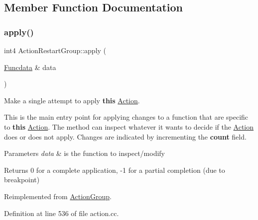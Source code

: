\subsection{Member Function Documentation}
\mbox{\label{class_action_restart_group_ab597697ab15a9b8f1a25832f43bdeb0d}} 
\subsubsection{\texorpdfstring{apply()}{apply()}}
{\footnotesize\ttfamily int4 Action\+Restart\+Group\+::apply (\begin{DoxyParamCaption}\item[{\mbox{\hyperlink{class_funcdata}{Funcdata}} \&}]{data }\end{DoxyParamCaption})\hspace{0.3cm}{\ttfamily [virtual]}}



Make a single attempt to apply {\bfseries{this}} \mbox{\hyperlink{class_action}{Action}}. 

This is the main entry point for applying changes to a function that are specific to {\bfseries{this}} \mbox{\hyperlink{class_action}{Action}}. The method can inspect whatever it wants to decide if the \mbox{\hyperlink{class_action}{Action}} does or does not apply. Changes are indicated by incrementing the {\bfseries{count}} field. 
\begin{DoxyParams}{Parameters}
{\em data} & is the function to inspect/modify \\
\hline
\end{DoxyParams}
\begin{DoxyReturn}{Returns}
0 for a complete application, -\/1 for a partial completion (due to breakpoint) 
\end{DoxyReturn}


Reimplemented from \mbox{\hyperlink{class_action_group_aaaab0b0f5c7a14752cd57478de2e9290}{Action\+Group}}.



Definition at line 536 of file action.\+cc.

